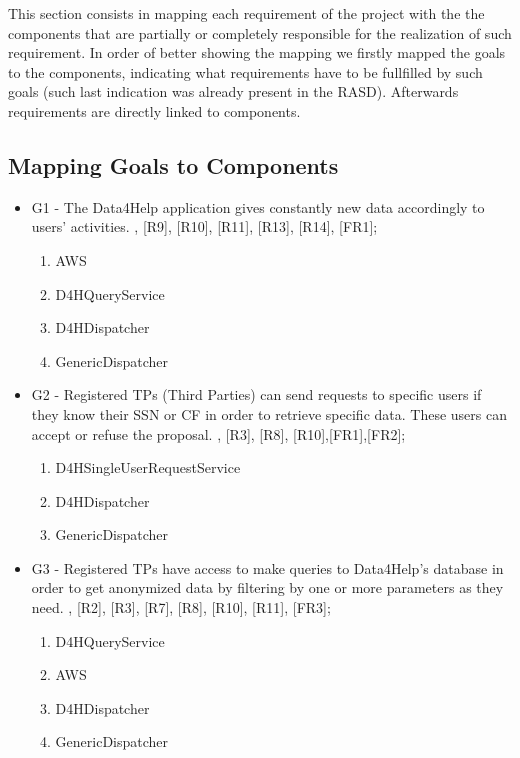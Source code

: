 This section consists in mapping each requirement of the project with the the components that are partially or completely responsible for the realization of such requirement.
In order of better showing the mapping we firstly mapped the goals to the components, indicating what requirements have to be fullfilled by such goals (such last indication was already present in the RASD).
Afterwards requirements are directly linked to components.
\newline
{\color{bluesec}\subsection{Mapping Goals to Components}}

\begin{itemize}
\item G1 - The Data4Help application gives constantly new data accordingly to users’ activities.
\newline [R8], [R9], [R10], [R11], [R13], [R14], [FR1];
\begin{enumerate}
	\item AWS
	\item D4HQueryService
	\item D4HDispatcher
	\item GenericDispatcher
\end{enumerate}


\item G2 - Registered TPs (Third Parties) can send requests to specific users if they know their SSN or CF in order to retrieve specific data. These users can accept or refuse the proposal.
\newline [R2], [R3], [R8], [R10],[FR1],[FR2];
\begin{enumerate}
	\item D4HSingleUserRequestService
	\item D4HDispatcher
	\item GenericDispatcher
\end{enumerate}


\item G3 - Registered TPs have access to make queries to Data4Help’s database in order to get anonymized data by filtering by one or more parameters as they need.
\newline [R1], [R2], [R3], [R7], [R8], [R10], [R11], [FR3];
\begin{enumerate}
	\item D4HQueryService
	\item AWS
	\item D4HDispatcher
	\item GenericDispatcher
\end{enumerate}



\end{itemize}
